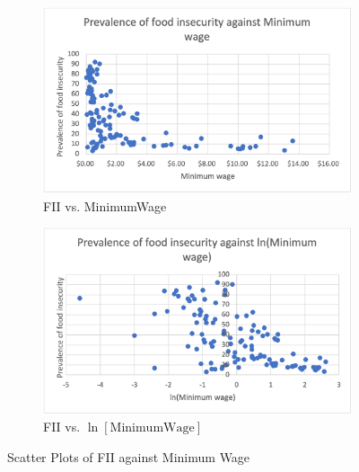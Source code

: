 \documentclass{article}
\begin{document}
\begin{appendices}
\begin{figure}[H]
     \centering
     \begin{subfigure}[b]{0.475\textwidth}
         \centering
         \includegraphics[width=\textwidth]{Images/minwage.png}
         \caption{FII vs. MinimumWage}
         \label{fig:gdppcscatter}
     \end{subfigure}
     \hfill
     \begin{subfigure}[b]{0.475\textwidth}
         \centering
         \includegraphics[width=\textwidth]{Images/lnminwage.png}
         \caption{FII vs. $\ln{[\text{MinimumWage}]}$}
         \label{fig:lggpdpcscatter}
     \end{subfigure}
    \caption{Scatter Plots of FII against Minimum Wage}
    \label{fig:scatterminwage}
\end{figure}


\end{appendices}
\end{document}
